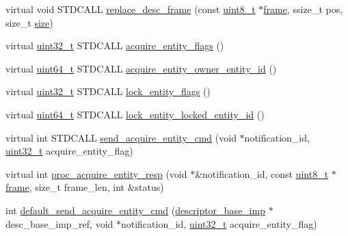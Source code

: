 \begin{DoxyCompactItemize}
\item 
virtual void S\+T\+D\+C\+A\+LL \hyperlink{classavdecc__lib_1_1descriptor__base__imp_a8dbf7d4faedf36ec789d33f228e22039}{replace\+\_\+desc\+\_\+frame} (const \hyperlink{stdint_8h_aba7bc1797add20fe3efdf37ced1182c5}{uint8\+\_\+t} $\ast$\hyperlink{gst__avb__playbin_8c_ac8e710e0b5e994c0545d75d69868c6f0}{frame}, ssize\+\_\+t pos, size\+\_\+t \hyperlink{gst__avb__playbin_8c_a439227feff9d7f55384e8780cfc2eb82}{size})
\item 
virtual \hyperlink{parse_8c_a6eb1e68cc391dd753bc8ce896dbb8315}{uint32\+\_\+t} S\+T\+D\+C\+A\+LL \hyperlink{classavdecc__lib_1_1descriptor__base__imp_a2d270d205bcea948cf61311a1f8336c6}{acquire\+\_\+entity\+\_\+flags} ()
\item 
virtual \hyperlink{parse_8c_aec6fcb673ff035718c238c8c9d544c47}{uint64\+\_\+t} S\+T\+D\+C\+A\+LL \hyperlink{classavdecc__lib_1_1descriptor__base__imp_a507b250a984bb5611d2699cd26d60a51}{acquire\+\_\+entity\+\_\+owner\+\_\+entity\+\_\+id} ()
\item 
virtual \hyperlink{parse_8c_a6eb1e68cc391dd753bc8ce896dbb8315}{uint32\+\_\+t} S\+T\+D\+C\+A\+LL \hyperlink{classavdecc__lib_1_1descriptor__base__imp_afe2564a2a32f83deced28efa17f332e2}{lock\+\_\+entity\+\_\+flags} ()
\item 
virtual \hyperlink{parse_8c_aec6fcb673ff035718c238c8c9d544c47}{uint64\+\_\+t} S\+T\+D\+C\+A\+LL \hyperlink{classavdecc__lib_1_1descriptor__base__imp_aeb8f096d55f82522516cbf00a616246a}{lock\+\_\+entity\+\_\+locked\+\_\+entity\+\_\+id} ()
\item 
virtual int S\+T\+D\+C\+A\+LL \hyperlink{classavdecc__lib_1_1descriptor__base__imp_aea9e3053b75477816c15487d3e9a6f70}{send\+\_\+acquire\+\_\+entity\+\_\+cmd} (void $\ast$notification\+\_\+id, \hyperlink{parse_8c_a6eb1e68cc391dd753bc8ce896dbb8315}{uint32\+\_\+t} acquire\+\_\+entity\+\_\+flag)
\item 
virtual int \hyperlink{classavdecc__lib_1_1descriptor__base__imp_a934de13d0b017574d514ce276180a004}{proc\+\_\+acquire\+\_\+entity\+\_\+resp} (void $\ast$\&notification\+\_\+id, const \hyperlink{stdint_8h_aba7bc1797add20fe3efdf37ced1182c5}{uint8\+\_\+t} $\ast$\hyperlink{gst__avb__playbin_8c_ac8e710e0b5e994c0545d75d69868c6f0}{frame}, size\+\_\+t frame\+\_\+len, int \&status)
\item 
int \hyperlink{classavdecc__lib_1_1descriptor__base__imp_a4ee5f42b89a728627bf1340afebc7c82}{default\+\_\+send\+\_\+acquire\+\_\+entity\+\_\+cmd} (\hyperlink{classavdecc__lib_1_1descriptor__base__imp}{descriptor\+\_\+base\+\_\+imp} $\ast$desc\+\_\+base\+\_\+imp\+\_\+ref, void $\ast$notification\+\_\+id, \hyperlink{parse_8c_a6eb1e68cc391dd753bc8ce896dbb8315}{uint32\+\_\+t} acquire\+\_\+entity\+\_\+flag)

\end{DoxyCompactItemize}
